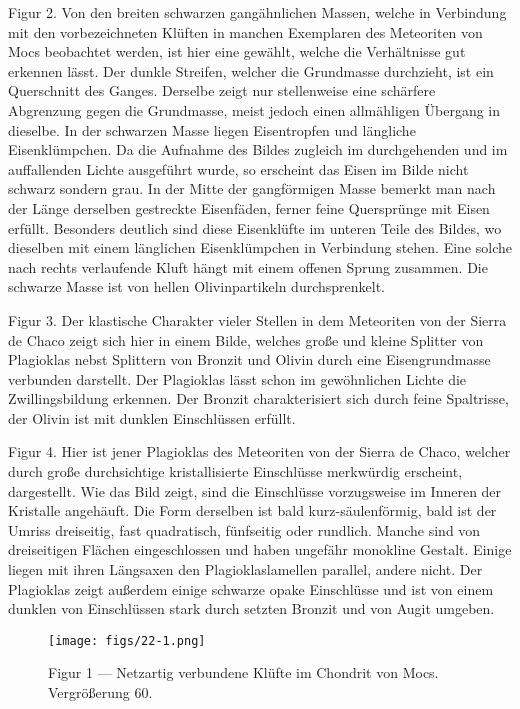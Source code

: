 \documentclass[a4paper, 12pt, oneside]{article}
\begin{document}
Figur 2. Von den breiten schwarzen gangähnlichen Massen, welche in Verbindung mit den vorbezeichneten Klüften in manchen Exemplaren des Meteoriten von Mocs beobachtet werden, ist hier eine gewählt, welche die Verhältnisse gut erkennen lässt. Der dunkle Streifen, welcher die Grundmasse durchzieht, ist ein Querschnitt des Ganges. Derselbe zeigt nur stellenweise eine schärfere Abgrenzung gegen die Grundmasse, meist jedoch einen allmähligen Übergang in dieselbe. In der schwarzen Masse liegen Eisentropfen und längliche Eisenklümpchen. Da die Aufnahme des Bildes zugleich im durchgehenden und im auffallenden Lichte ausgeführt wurde, so erscheint das Eisen im Bilde nicht schwarz sondern grau. In der Mitte der gangförmigen Masse bemerkt man nach der Länge derselben gestreckte Eisenfäden, ferner feine Quersprünge mit Eisen erfüllt. Besonders deutlich sind diese Eisenklüfte im unteren Teile des Bildes, wo dieselben mit einem länglichen Eisenklümpchen in Verbindung stehen. Eine solche nach rechts verlaufende Kluft hängt mit einem offenen Sprung zusammen. Die schwarze Masse ist von hellen Olivinpartikeln durchsprenkelt.

Figur 3. Der klastische Charakter vieler Stellen in dem Meteoriten von der Sierra de Chaco zeigt sich hier in einem Bilde, welches große und kleine Splitter von Plagioklas nebst Splittern von Bronzit und Olivin durch eine Eisengrundmasse verbunden darstellt. Der Plagioklas lässt schon im gewöhnlichen Lichte die Zwillingsbildung erkennen. Der Bronzit charakterisiert sich durch feine Spaltrisse, der Olivin ist mit dunklen Einschlüssen erfüllt.

Figur 4. Hier ist jener Plagioklas des Meteoriten von der Sierra de Chaco, welcher durch große durchsichtige kristallisierte Einschlüsse merkwürdig erscheint, dargestellt. Wie das Bild zeigt, sind die Einschlüsse vorzugsweise im Inneren der Kristalle angehäuft. Die Form derselben ist bald kurz-säulenförmig, bald ist der Umriss dreiseitig, fast quadratisch, fünfseitig oder rundlich. Manche sind von dreiseitigen Flächen eingeschlossen und haben ungefähr monokline Gestalt. Einige liegen mit ihren Längsaxen den Plagioklaslamellen parallel, andere nicht. Der Plagioklas zeigt außerdem einige schwarze opake Einschlüsse und ist von einem dunklen von Einschlüssen stark durch setzten Bronzit und von Augit umgeben.
\clearpage

\vspace*{\fill}
\begin{figure}[H]
\centering
\texttt{[image: figs/22-1.png]}
\caption{\small Figur 1 --- Netzartig verbundene Klüfte im Chondrit von Mocs. Vergrößerung 60.}
\end{figure}
\vspace*{\fill}
\clearpage
\end{document}
